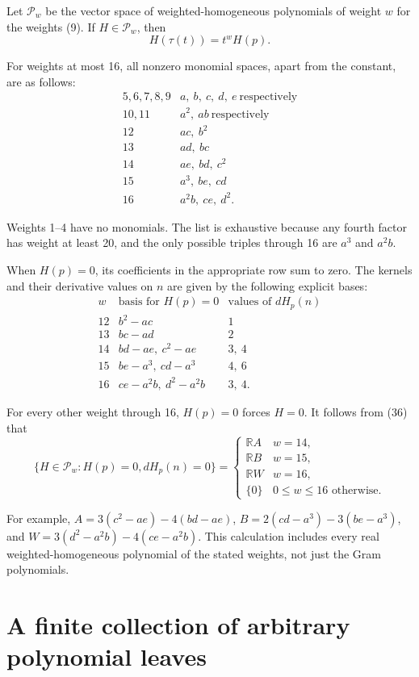 \documentclass[11pt]{article}
\begin{document}
Let \(\mathcal P_w\) be the vector space of weighted-homogeneous
polynomials of weight \(w\) for the weights (9). If \(H\in\mathcal P_w\),
then
\[
H(\tau(t))=t^w H(p).
\tag{34}
\]

For weights at most 16, all nonzero monomial spaces, apart from the constant,
are as follows:
\[
\begin{array}{c|l}
5,6,7,8,9&a,\ b,\ c,\ d,\ e\ \text{respectively}\\
10,11&a^2,\ ab\ \text{respectively}\\
12&ac,\ b^2\\
13&ad,\ bc\\
14&ae,\ bd,\ c^2\\
15&a^3,\ be,\ cd\\
16&a^2b,\ ce,\ d^2.
\end{array}
\tag{35}
\]

Weights 1--4 have no monomials. The list is exhaustive because any fourth
factor has weight at least 20, and the only possible triples through 16
are \(a^3\) and \(a^2b\).

When \(H(p)=0\), its coefficients in the appropriate row sum to zero.
The kernels and their derivative values on \(n\) are given by the following
explicit bases:
\[
\begin{array}{c|l|l}
w&\text{basis for }H(p)=0&\text{values of }dH_p(n)\\
12&b^2-ac&1\\
13&bc-ad&2\\
14&bd-ae,\ c^2-ae&3,\ 4\\
15&be-a^3,\ cd-a^3&4,\ 6\\
16&ce-a^2b,\ d^2-a^2b&3,\ 4.
\end{array}
\tag{36}
\]

For every other weight through 16, \(H(p)=0\) forces \(H=0\).
It follows from (36) that
\[
\{H\in\mathcal P_w:H(p)=0, dH_p(n)=0\}
=\begin{cases}
\mathbb R A&w=14,\\
\mathbb R B&w=15,\\
\mathbb R W&w=16,\\
\{0\}&0\le w\le16\text{ otherwise.}
\end{cases}
\tag{37}
\]

For example, \(A=3(c^2-ae)-4(bd-ae)\),
\(B=2(cd-a^3)-3(be-a^3)\), and
\(W=3(d^2-a^2b)-4(ce-a^2b)\). This calculation includes every real
weighted-homogeneous polynomial of the stated weights, not just the Gram
polynomials.

\section{A finite collection of arbitrary polynomial leaves}
\end{document}
